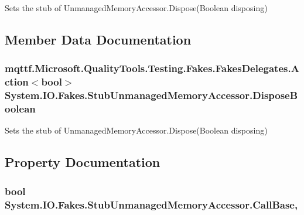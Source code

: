 Sets the stub of Unmanaged\-Memory\-Accessor.\-Dispose(\-Boolean disposing)



\subsection{Member Data Documentation}
\hypertarget{class_system_1_1_i_o_1_1_fakes_1_1_stub_unmanaged_memory_accessor_a4ea85c19dffb4226e19961cbcb432ad1}{
\subsubsection[{Dispose\-Boolean}]{\setlength{\rightskip}{0pt plus 5cm}mqttf.\-Microsoft.\-Quality\-Tools.\-Testing.\-Fakes.\-Fakes\-Delegates.\-Action$<$bool$>$ System.\-I\-O.\-Fakes.\-Stub\-Unmanaged\-Memory\-Accessor.\-Dispose\-Boolean}}\label{class_system_1_1_i_o_1_1_fakes_1_1_stub_unmanaged_memory_accessor_a4ea85c19dffb4226e19961cbcb432ad1}


Sets the stub of Unmanaged\-Memory\-Accessor.\-Dispose(\-Boolean disposing)



\subsection{Property Documentation}
\hypertarget{class_system_1_1_i_o_1_1_fakes_1_1_stub_unmanaged_memory_accessor_ab6e4df3d384f8fa5852c00925f732934}{
\subsubsection[{Call\-Base}]{\setlength{\rightskip}{0pt plus 5cm}bool System.\-I\-O.\-Fakes.\-Stub\-Unmanaged\-Memory\-Accessor.\-Call\-Base\hspace{0.3cm}{\ttfamily [get]}, {\ttfamily [set]}}}\label{class_system_1_1_i_o_1_1_fakes_1_1_stub_unmanaged_memory_accessor_ab6e4df3d384f8fa5852c00925f732934}


